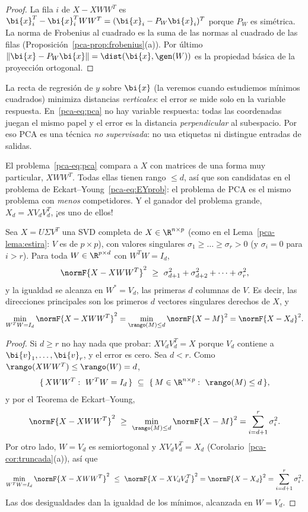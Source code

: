 \begin{proof}
La fila $i$ de $X-XWW^T$ es $\bi{x}_i^T-\bi{x}_i^T WW^T
=(\bi{x}_i-P_W\bi{x}_i)^T$ porque $P_W$ es simétrica. La norma de Frobenius al
cuadrado es la suma de las normas al cuadrado de las filas
(Proposición~\ref{pca-prop:frobenius}(a)). Por último
$\|\bi{x}-P_W\bi{x}\|=\dist(\bi{x},\gen(W))$ es la propiedad básica de la proyección
ortogonal.
\end{proof}

\begin{remark}
La recta de regresión de $y$ sobre $\bi{x}$ (la veremos cuando estudiemos mínimos
cuadrados) minimiza distancias \emph{verticales}: el error se mide solo en la
variable respuesta. En~\eqref{pca-eq:pca} no hay variable respuesta: todas
las coordenadas juegan el mismo papel y el error es la distancia
\emph{perpendicular} al subespacio. Por eso PCA es una técnica
\emph{no supervisada}: no usa etiquetas ni distingue entradas de salidas.
\end{remark}

El problema~\eqref{pca-eq:pca} compara a $X$ con matrices de una forma muy
particular, $XWW^T$. Todas ellas tienen rango $\le d$, así que son
candidatas en el problema de Eckart--Young~\eqref{pca-eq:EYprob}: el problema
de PCA es el mismo problema con \emph{menos} competidores. Y el ganador del
problema grande, $X_d=XV_dV_d^T$, ¡es uno de ellos!

\begin{theorem}\label{pca-teo:pca}
Sea $X=U\Sigma V^T$ una SVD completa de $X\in\R^{n\times p}$ (como en el
Lema~\ref{pca-lema:estira}: $V$ es de $p\times p$), con valores
singulares $\sigma_1\ge\dots\ge\sigma_r>0$ (y $\sigma_i=0$ para $i>r$). Para
toda $W\in\R^{p\times d}$ con $W^T W=I_d$,
\[
\normF{X-XWW^T}^2\ \ge\ \sigma_{d+1}^2+\sigma_{d+2}^2+\dots+\sigma_r^2 ,
\]
y la igualdad se alcanza en $W^\ast=V_d$, las primeras $d$ columnas de $V$.
Es decir, las direcciones principales son los primeros $d$ vectores
singulares derechos de $X$, y
\[
\min_{W^T W=I_d}\normF{X-XWW^T}^2
=\min_{\rango(M)\le d}\normF{X-M}^2=\normF{X-X_d}^2 .
\]
\end{theorem}

\begin{proof}
Si $d\ge r$ no hay nada que probar: $XV_dV_d^T=X$ porque $V_d$ contiene a
$\bi{v}_1,\dots,\bi{v}_r$, y el error es cero. Sea $d<r$. Como
$\rango(XWW^T)\le\rango(W)=d$,
\[
\{\,XWW^T:\ W^T W=I_d\,\}\ \subseteq\ \{\,M\in\R^{n\times p}:\ \rango(M)\le d\,\},
\]
y por el Teorema de Eckart--Young,
\[
\normF{X-XWW^T}^2\ \ge\ \min_{\rango(M)\le d}\normF{X-M}^2
=\sum_{i=d+1}^r\sigma_i^2 .
\]
Por otro lado, $W=V_d$ es semiortogonal y $XV_dV_d^T=X_d$
(Corolario~\ref{pca-cor:truncada}(a)), así que
\[
\min_{W^T W=I_d}\normF{X-XWW^T}^2\ \le\ \normF{X-XV_dV_d^T}^2
=\normF{X-X_d}^2=\sum_{i=d+1}^r\sigma_i^2 .
\]
Las dos desigualdades dan la igualdad de los mínimos, alcanzada en $W=V_d$.
\end{proof}

